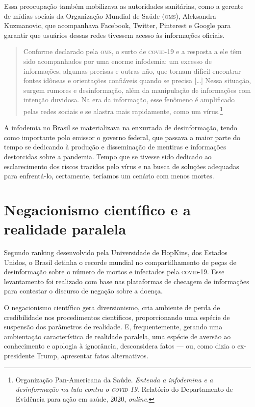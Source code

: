 Essa preocupação também mobilizava as autoridades sanitárias, como a
gerente de mídias sociais da Organização Mundial de Saúde (\textsc{oms}),
Aleksandra Kuzmanovic, que acompanhava Facebook, Twitter, Pinterest e
Google para garantir que usuários dessas redes tivessem acesso às
informações oficiais.

\begin{quote}
Conforme declarado pela \textsc{oms}, o surto de \textsc{covid-19} e a resposta a ele têm
sido acompanhados por uma enorme infodemia: um excesso de informações,
algumas precisas e outras não, que tornam difícil encontrar fontes
idôneas e orientações confiáveis quando se precisa {[}\ldots{]} Nessa situação,
surgem rumores e desinformação, além da manipulação de informações com
intenção duvidosa. Na era da informação, esse fenômeno é amplificado
pelas redes sociais e se alastra mais rapidamente, como um vírus.\footnote{Organização Pan-Americana da Saúde. \textit{Entenda a infodemina e a desinformação na luta contra o \textsc{covid-19}}. Relatório do Departamento de Evidência para ação em saúde, 2020, \textit{online}.}
\end{quote}

A infodemia no Brasil se materializava na enxurrada de desinformação,
tendo como importante polo emissor o governo federal, que passava a maior 
parte do tempo se dedicando à produção e disseminação de mentiras e informações
destorcidas sobre a pandemia. Tempo que se tivesse sido dedicado ao
esclarecimento dos riscos trazidos pelo vírus e na busca de soluções
adequadas para enfrentá-lo, certamente, teríamos um cenário com menos
mortes.

\section{Negacionismo científico e a realidade paralela}

Segundo ranking desenvolvido pela Universidade de HopKins, dos Estados
Unidos, o Brasil detinha o recorde mundial no compartilhamento de peças
de desinformação sobre o número de mortos e infectados pela \textsc{covid-19}.
Esse levantamento foi realizado com base nas plataformas de checagem de
informações para contestar o discurso de negação sobre a doença.

O negacionismo científico gera diversionismo, cria ambiente de perda de
credibilidade nos procedimentos científicos, proporcionando uma espécie
de suspensão dos parâmetros de realidade. E, frequentemente, gerando uma
ambientação característica de realidade paralela, uma espécie de aversão
ao conhecimento e apologia à ignorância, desconsidera fatos --- ou, como
dizia o ex-presidente Trump, apresentar fatos alternativos.

